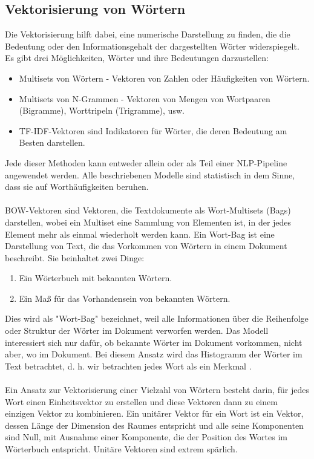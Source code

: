 \subsection{Vektorisierung von Wörtern}
Die Vektorisierung hilft dabei, eine numerische Darstellung zu finden, die die Bedeutung oder den Informationsgehalt der dargestellten Wörter widerspiegelt. 
Es gibt drei Möglichkeiten, Wörter und ihre Bedeutungen darzustellen:
\begin{itemize}
    \item Multisets von Wörtern - Vektoren von Zahlen oder Häufigkeiten von Wörtern. 
    \item Multisets von N-Grammen - Vektoren von Mengen von Wortpaaren (Bigramme), Worttripeln (Trigramme), usw.
    \item TF-IDF-Vektoren sind Indikatoren für Wörter, die deren Bedeutung am Besten darstellen.
\end{itemize}
Jede dieser Methoden kann entweder allein oder als Teil einer \ac{NLP}-Pipeline angewendet werden. 
Alle beschriebenen Modelle sind statistisch in dem Sinne, dass sie auf Worthäufigkeiten beruhen.\\\\
\ac{BOW}-Vektoren sind Vektoren, die Textdokumente als Wort-Multisets (Bags) darstellen, wobei ein Multiset eine Sammlung von Elementen ist, in der jedes Element mehr als einmal wiederholt werden kann. 
Ein Wort-Bag ist eine Darstellung von Text, die das Vorkommen von Wörtern in einem Dokument beschreibt. 
Sie beinhaltet zwei Dinge:
\begin{enumerate}
    \item Ein Wörterbuch mit bekannten Wörtern.
    \item Ein Maß für das Vorhandensein von bekannten Wörtern.
\end{enumerate}
Dies wird als "Wort-Bag" bezeichnet, weil alle Informationen über die Reihenfolge oder Struktur der Wörter im Dokument verworfen werden. 
Das Modell interessiert sich nur dafür, ob bekannte Wörter im Dokument vorkommen, nicht aber, wo im Dokument. 
Bei diesem Ansatz wird das Histogramm der Wörter im Text betrachtet, d. h. wir betrachten jedes Wort als ein Merkmal \cite{goldberg_neural_2017}.\\\\
Ein Ansatz zur Vektorisierung einer Vielzahl von Wörtern besteht darin, für jedes Wort einen Einheitsvektor zu erstellen und diese Vektoren dann zu einem einzigen Vektor zu kombinieren. 
Ein unitärer Vektor für ein Wort ist ein Vektor, dessen Länge der Dimension des Raumes entspricht und alle seine Komponenten sind Null, mit Ausnahme einer Komponente, die der Position des Wortes im Wörterbuch entspricht. Unitäre Vektoren sind extrem spärlich. 
